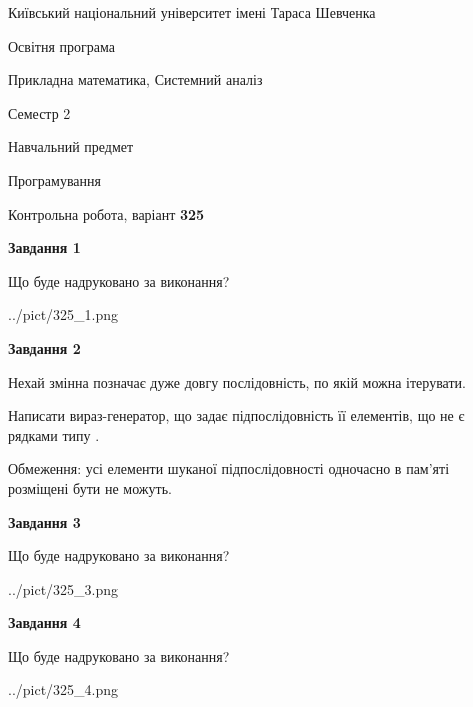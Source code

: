 \documentclass[12pt, ukrainian]{article}
\begin{document}
{{\begin {small}\par
{ \center  Київський національний університет імені Тараса Шевченка \par}
{\parbox {5 cm}{Освітня програма \hfill}{\parbox {8 cm}{Прикладна математика, Системний аналіз \hfill}}\parbox {5 cm}{\hfill Семестр 2}}\par
{\parbox {5 cm} {Навчальний предмет \hfill}\parbox {7 cm}{Програмування \hfill}\parbox {6cm}{\hfill}\par}\vspace{-7pt} \end{small}}{\center Контрольна робота, варіант  \No \textbf
{ 325 }\par}}
{
\begin {large}
{\begin {center}\textbf{Завдання 1}\end {center}}\par
Що буде надруковано за виконання?\par\par
\begin{center}
	{../pict/325_1.png}
\end{center}
\newpage

{\begin {center}\textbf{Завдання 2}\end {center}}\par
Нехай змінна  позначає дуже довгу послідовність, по якій можна ітерувати.

Написати вираз-генератор, що задає підпослідовність її елементів, що не є рядками типу .

Обмеження: усі елементи шуканої підпослідовності одночасно в пам'яті розміщені бути не можуть.\par
\newpage

{\begin {center}\textbf{Завдання 3}\end {center}}\par
Що буде надруковано за виконання?
\begin{center}
	{../pict/325_3.png}
\end{center}
\newpage

{\begin {center}\textbf{Завдання 4}\end {center}}\par
Що буде надруковано за виконання?\par
\begin{center}
	{../pict/325_4.png}
\end{center}
\newpage


\end{large}}
\end{document}
